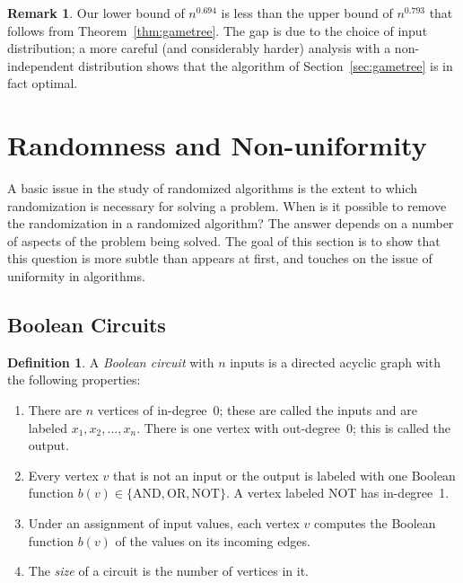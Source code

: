 \documentclass[twoside,12pt]{book}
\theoremstyle{plain}
\theoremstyle{definition}
\newtheorem{definition}[theorem]{Definition}
\newtheorem{remark}[theorem]{Remark}
\theoremstyle{remark}
\begin{document}
\begin{remark}
Our lower bound of $n^{0.694}$ is less than the upper bound of $n^{0.793}$
that follows from Theorem~\ref{thm:gametree}.  The gap is due to the choice
of input distribution; a more careful (and considerably harder) analysis with
a non-independent distribution shows that the algorithm of
Section~\ref{sec:gametree} is in fact optimal.
\end{remark}

\section{Randomness and Non-uniformity}
\label{sec:nonuniform}

A basic issue in the study of randomized algorithms is the extent to which
randomization is necessary for solving a problem.  When is it possible to
remove the randomization in a randomized algorithm?  The answer depends on a
number of aspects of the problem being solved.  The goal of this section is to
show that this question is more subtle than appears at first, and touches on
the issue of uniformity in algorithms.

\subsection{Boolean Circuits}

\begin{definition}
A \emph{Boolean circuit} with $n$ inputs is a directed acyclic graph with the
following properties:
\begin{enumerate}
  \item There are $n$ vertices of in-degree~0; these are called the inputs and
    are labeled $x_1,x_2,\ldots,x_n$.  There is one vertex with out-degree~0;
    this is called the output.
  \item Every vertex $v$ that is not an input or the output is labeled with one
    Boolean function $b(v)\in\{\mathrm{AND},\mathrm{OR},\mathrm{NOT}\}$.  A
    vertex labeled NOT has in-degree~1.
  \item Under an assignment of input values, each vertex $v$ computes the
    Boolean function $b(v)$ of the values on its incoming edges.
  \item The \emph{size} of a circuit is the number of vertices in it.
\end{enumerate}
\end{definition}
\end{document}

